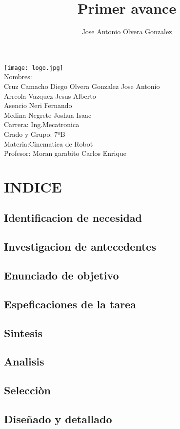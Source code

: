 \documentclass[12pt,letterpaper]{report}
\author{Jose Antonio Olvera Gonzalez }
\title{Primer avance}
\begin{document}
\begin{center}
\texttt{[image: logo.jpg]}\\

Nombres:\\ Cruz Camacho Diego
		Olvera Gonzalez Jose Antonio\\
		Arreola Vazquez Jesus Alberto\\
		Asencio Neri Fernando\\
		Medina Negrete Joshua Isaac\\
Carrera: Ing.Mecatronica\\
Grado y Grupo: 7ºB\\
Materia:Cinematica de Robot\\
Profesor: Moran garabito Carlos Enrique
		
		
		
\chapter{INDICE}
\end{center}	




\section{Identificacion de necesidad}
\section{Investigacion de antecedentes}
\section{Enunciado de objetivo}
\section{Espeficaciones de la tarea}
\section{Sintesis}
\section{Analisis}
\section{Selecciòn}
\section{Diseñado y detallado}
\end{document}
